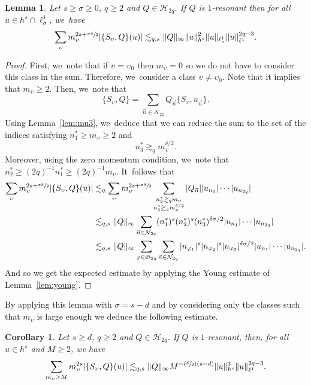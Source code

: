 \documentclass[10pt,a4paper]{amsart}
\newcommand{\Psfrac}[2]{(\sfrac{#1}{#2})}
\theoremstyle{plain}
\newtheorem{corollary}[theorem]{Corollary}
\newtheorem{lemma}[theorem]{Lemma}
\theoremstyle{definition}
\newcommand{\1}{\mathbf{1}}
\begin{document}
\begin{lemma} Let $s\geq \sigma \geq 0$, $q\geq 2$ and $Q\in\mathcal{H}_{2q}$. If $Q$ is $1$-resonant then for all $u\in h^{s} \cap \ell^1_\sigma$, we~have
\[
\sum_{\upsilon} m_\upsilon^{2s+\sfrac{\sigma \delta}2} |\{S_{\upsilon},Q\}(u)| \lesssim_{q,s} \|Q\|_{\infty} \|u\|_{h^{s}}^{2} \| u \|_{\ell^1_\sigma} \|u\|_{\ell^{1}}^{2q-3}.
\]
\end{lemma}
\begin{proof} First, we~note that if $\upsilon = \upsilon_0$ then $m_\upsilon = 0$ so we do not have to consider this class in the sum. Therefore, we~consider a class $\upsilon \neq \upsilon_0$. Note that it implies that $m_{\upsilon} \geq 2.$ Then, we~note that
\[
\{S_{\upsilon},Q\} = \sum_{\vec{n}\in\mathcal{N}_{2q}} Q_{\vec{n}} \{S_\upsilon, u_{\vec{n}} \}.
\]
Using Lemma~\ref{lem:mu3}, we~deduce that we can reduce the sum to the set of the indices satisfying $n_{1}^{\ast}\geq m_\upsilon \geq 2$ and
\[
n_{3}^{\ast}\gtrsim_{q}m_\upsilon^{\delta/2}.
\]
Moreover, using the zero momentum condition, we~note that $n_{2}^{\ast}\geq (2q)^{-1} n_1^\ast \geq (2q)^{-1} m_\upsilon$. It~follows that
\begin{align*}
\sum_{\upsilon } m_\upsilon^{2s+\sfrac{\sigma \delta}2}|\{S_{\upsilon},Q\}(u)|
&\lesssim_q \sum_{\upsilon} m_\upsilon^{2s+\sfrac{\sigma \delta}2} \sum_{\substack{n_{2}^{\ast} \gtrsim_q m_\upsilon \\ n_{3}^{\ast} \gtrsim_{q} m_\upsilon^{\delta/2} }}|Q_{\vec{n}}||u_{n_1}| \cdots |u_{n_{2q}}| \\
&\lesssim_{q,s} \| Q\|_{\infty} \sum_{\vec{n}\in\mathcal{N}_{2q}} (n_{1}^{\ast})^{s} (n_{2}^{\ast})^{s} (n_{3}^{\ast})^{\delta \sigma /2} |u_{n_{1}}|\cdots |u_{n_{2q}}| \\
&\lesssim_{q,s} \| Q\|_{\infty} \sum_{\varphi \in \mathfrak{S}_{2q}} \sum_{\vec{n}\in\mathcal{N}_{2q}} |n_{\varphi_1}|^{s} |n_{\varphi_2}|^{s} |n_{\varphi_3}|^{\delta \sigma /2} |u_{n_{1}}|\cdots |u_{n_{2q}}|.
\end{align*}
And so we get the expected estimate by applying the Young estimate of Lemma~\ref{lem:young}.
\end{proof}

By applying this lemma with $\sigma = s-d$ and by considering only the classes such that $m_\upsilon$ is large enough we deduce the following estimate.
\begin{corollary}
\label{cor:super}Let $s\geq d$, $q\geq 2$ and $Q\in\mathcal{H}_{2q}$. If $Q$ is $1$-resonant, then, for all $u\in h^{s}$ and $M\geq 2$, we have
\begin{equation}
\label{eq:super}
\sum_{m_\upsilon \geq M} m_\upsilon^{2s} |\{S_{\upsilon},Q\}(u)| \lesssim_{q,s} \|Q\|_{\infty} M^{-\Psfrac{\delta}{2}(s-d)}\|u\|_{h^{s}}^{3} \|u\|_{\ell^{1}}^{2q-3}.
\end{equation}
\end{corollary}
\end{document}

